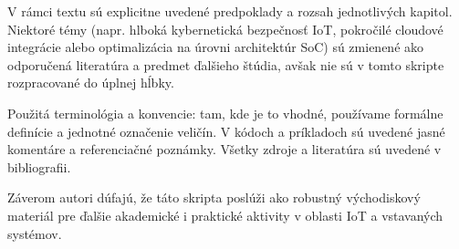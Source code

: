 V rámci textu sú explicitne uvedené predpoklady a rozsah jednotlivých kapitol. Niektoré témy (napr. hlboká kybernetická bezpečnosť IoT, pokročilé cloudové integrácie alebo optimalizácia na úrovni architektúr SoC) sú zmienené ako odporučená literatúra a predmet ďalšieho štúdia, avšak nie sú v tomto skripte rozpracované do úplnej hĺbky.

Použitá terminológia a konvencie: tam, kde je to vhodné, používame formálne definície a jednotné označenie veličín. V kódoch a príkladoch sú uvedené jasné komentáre a referenciačné poznámky. Všetky zdroje a literatúra sú uvedené v bibliografii.

Záverom autori dúfajú, že táto skripta poslúži ako robustný východiskový materiál pre ďalšie akademické i praktické aktivity v oblasti IoT a vstavaných systémov.
